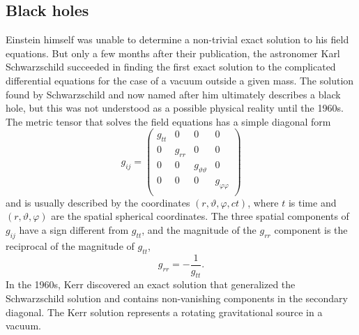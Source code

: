 \subsection{Black holes}
Einstein himself was unable to determine a non-trivial exact solution to his field equations.
But only a few months after their
publication, the astronomer Karl Schwarzschild succeeded in
finding the first exact solution to the complicated differential equations
for the case of a vacuum outside a given mass.
The solution found by Schwarzschild and now named after him
ultimately describes a black hole,
but this was not understood as a possible physical reality
until the 1960s. The metric tensor that solves the field equations has a
simple diagonal form
\begin{equation}
	g_{ij}
	= \left(\begin{array}{cccc}
		g_{tt} &   0    &   0    &  0     \\
		   0   & g_{rr} &   0    &   0    \\
		   0   &   0    & g_{\vartheta\vartheta} &  0 \\
		   0   &   0    &   0    & g_{\varphi\varphi} \\
	\end{array}\right)
	\label{eq:Schwarzschild-schema}
\end{equation}
and is usually described by the coordinates $(r, \vartheta, \varphi, ct)$,
where $t$ is time and 
$(r, \vartheta, \varphi)$
are the spatial spherical coordinates.
The  three spatial components of $g_{ij}$ have
a sign different from $g_{tt}$,
and the magnitude of the $g_{rr}$ component
is the reciprocal of the magnitude of $g_{tt}$,
\begin{equation}
	g_{rr} = -\frac{1}{g_{tt}}
    .
\end{equation}
In the 1960s, Kerr discovered an exact solution that generalized the Schwarzschild solution and contains non-vanishing
components in the secondary diagonal.
The Kerr solution represents a rotating gravitational source
in a vacuum. \cite[Chap. 6]{Chandrasekhar-1983} %


